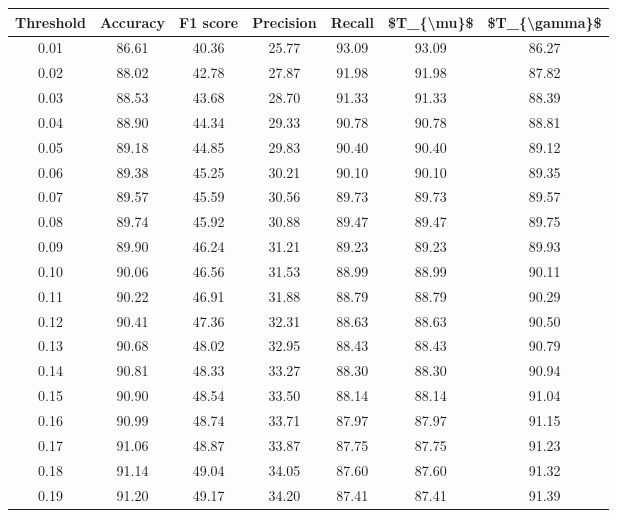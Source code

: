 \begin{tabular}{|c|c|c|c|c|c|c|}
\hline
 Threshold &  Accuracy &  F1 score &  Precision &  Recall &  \$T\_\{\textbackslash mu\}\$ &  \$T\_\{\textbackslash gamma\}\$ \\
\hline
      0.01 &     86.61 &     40.36 &      25.77 &   93.09 &      93.09 &         86.27 \\
      0.02 &     88.02 &     42.78 &      27.87 &   91.98 &      91.98 &         87.82 \\
      0.03 &     88.53 &     43.68 &      28.70 &   91.33 &      91.33 &         88.39 \\
      0.04 &     88.90 &     44.34 &      29.33 &   90.78 &      90.78 &         88.81 \\
      0.05 &     89.18 &     44.85 &      29.83 &   90.40 &      90.40 &         89.12 \\
      0.06 &     89.38 &     45.25 &      30.21 &   90.10 &      90.10 &         89.35 \\
      0.07 &     89.57 &     45.59 &      30.56 &   89.73 &      89.73 &         89.57 \\
      0.08 &     89.74 &     45.92 &      30.88 &   89.47 &      89.47 &         89.75 \\
      0.09 &     89.90 &     46.24 &      31.21 &   89.23 &      89.23 &         89.93 \\
      0.10 &     90.06 &     46.56 &      31.53 &   88.99 &      88.99 &         90.11 \\
      0.11 &     90.22 &     46.91 &      31.88 &   88.79 &      88.79 &         90.29 \\
      0.12 &     90.41 &     47.36 &      32.31 &   88.63 &      88.63 &         90.50 \\
      0.13 &     90.68 &     48.02 &      32.95 &   88.43 &      88.43 &         90.79 \\
      0.14 &     90.81 &     48.33 &      33.27 &   88.30 &      88.30 &         90.94 \\
      0.15 &     90.90 &     48.54 &      33.50 &   88.14 &      88.14 &         91.04 \\
      0.16 &     90.99 &     48.74 &      33.71 &   87.97 &      87.97 &         91.15 \\
      0.17 &     91.06 &     48.87 &      33.87 &   87.75 &      87.75 &         91.23 \\
      0.18 &     91.14 &     49.04 &      34.05 &   87.60 &      87.60 &         91.32 \\
      0.19 &     91.20 &     49.17 &      34.20 &   87.41 &      87.41 &         91.39 \\

\end{tabular}
